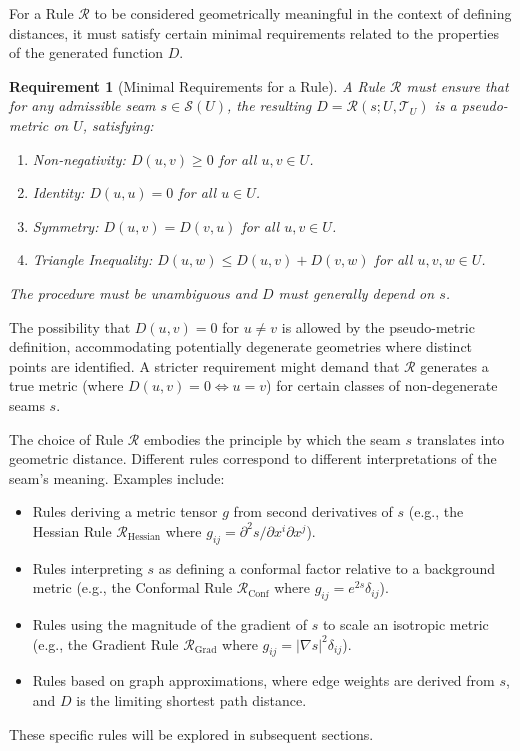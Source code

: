\documentclass[twoside,twocolumn]{article}
\newtheorem{requirement}{Requirement}[definition]
\begin{document}
For a Rule $\mathcal{R}$ to be considered geometrically meaningful in the context of defining distances, it must satisfy certain minimal requirements related to the properties of the generated function $D$.

\begin{requirement}[Minimal Requirements for a Rule]\label{req:RuleReqs}
A Rule \( \mathcal{R} \) must ensure that for any admissible seam \( s \in \mathcal{S}(U) \), the resulting \( D = \mathcal{R}(s; U, \mathcal{T}_U) \) is a pseudo-metric on \( U \), satisfying:
\begin{enumerate}[label=(M\arabic*)]
\item \textit{Non-negativity:} \( D(u, v) \ge 0 \) for all \( u, v \in U \).
\item \textit{Identity:} \( D(u, u) = 0 \) for all \( u \in U \).
\item \textit{Symmetry:} \( D(u, v) = D(v, u) \) for all \( u, v \in U \).
\item \textit{Triangle Inequality:} \( D(u, w) \le D(u, v) + D(v, w) \) for all \( u, v, w \in U \).
\end{enumerate}
The procedure must be unambiguous and \( D \) must generally depend on \( s \).
\end{requirement}

\noindent The possibility that $D(u, v) = 0$ for $u \neq v$ is allowed by the pseudo-metric definition, accommodating potentially degenerate geometries where distinct points are identified. A stricter requirement might demand that $\mathcal{R}$ generates a true metric (where $D(u, v) = 0 \iff u=v$) for certain classes of non-degenerate seams $s$.

The choice of Rule $\mathcal{R}$ embodies the principle by which the seam $s$ translates into geometric distance. Different rules correspond to different interpretations of the seam's meaning. Examples include:
\begin{itemize}
    \item Rules deriving a metric tensor $g$ from second derivatives of $s$ (e.g., the Hessian Rule $\mathcal{R}_{\text{Hessian}}$ where $g_{ij} = \partial^2 s / \partial x^i \partial x^j$).
    \item Rules interpreting $s$ as defining a conformal factor relative to a background metric (e.g., the Conformal Rule $\mathcal{R}_{\text{Conf}}$ where $g_{ij} = e^{2s} \delta_{ij}$).
    \item Rules using the magnitude of the gradient of $s$ to scale an isotropic metric (e.g., the Gradient Rule \( \mathcal{R}_{\text{Grad}} \) where \( g_{ij} = |\nabla s|^2 \delta_{ij} \)). %
    \item Rules based on graph approximations, where edge weights are derived from $s$, and $D$ is the limiting shortest path distance.
\end{itemize}
These specific rules will be explored in subsequent sections.
\end{document}
